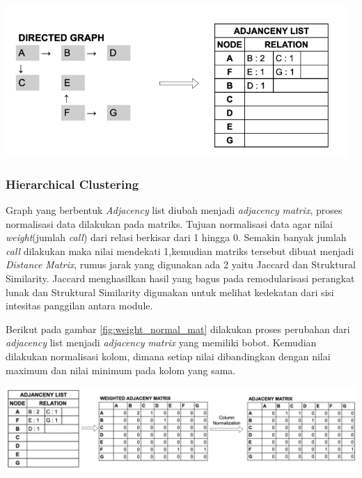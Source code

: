 \begin{center}
	\includegraphics[width=13cm]{img/bab_3/dg_al.png}
	\label{fig:dg_al}
\end{center}

\subsubsection{Hierarchical Clustering}
Graph yang berbentuk \textit{Adjacency} list diubah menjadi \textit{adjacency} \textit{matrix}, proses normalisasi data dilakukan pada matriks. Tujuan normalisasi data agar nilai \textit{weight}(jumlah \textit{call}) dari relasi berkisar dari 1 hingga 0. Semakin banyak jumlah \textit{call} dilakukan maka nilai mendekati 1,kemudian matriks tersebut dibuat menjadi \textit{Distance} \textit{Matrix}, rumus jarak yang digunakan ada 2 yaitu Jaccard dan Struktural Similarity. Jaccard menghasilkan hasil yang bagus pada remodularisasi perangkat lunak dan Struktural Similarity digunakan untuk melihat kedekatan dari sisi intesitas panggilan antara module.

Berikut pada gambar \ref{fig:weight_normal_mat} dilakukan proses perubahan dari \textit{adjacency} list menjadi \textit{adjacency} \textit{matrix} yang memiliki bobot. Kemudian dilakukan normalisasi kolom, dimana setiap nilai dibandingkan dengan nilai maximum dan nilai minimum pada kolom yang sama. 

\begin{center}
	\includegraphics[width=14cm]{img/bab_3/weight_normal_mat.png}
	\label{fig:weight_normal_mat}
\end{center}

